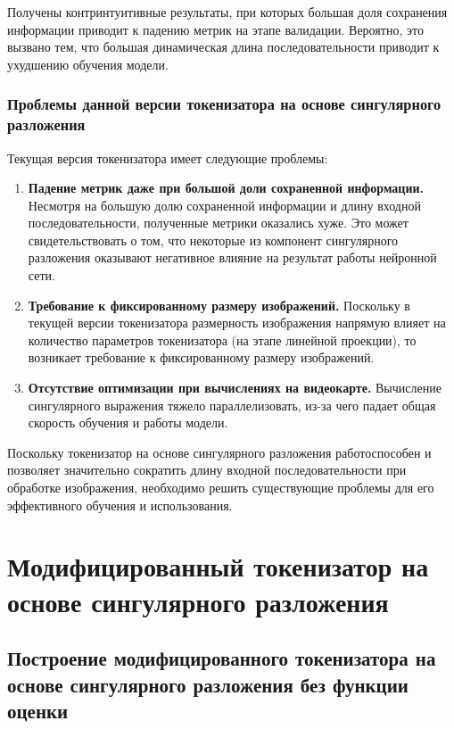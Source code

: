 \documentclass[times,specification,annotation]{itmo-student-thesis}
\begin{document}
Получены контринтуитивные результаты, при которых большая доля сохранения информации приводит к падению метрик на этапе валидации. Вероятно, это вызвано тем, что большая динамическая длина последовательности приводит к ухудшению обучения модели.

\subsubsection{Проблемы данной версии токенизатора на основе сингулярного разложения}

Текущая версия токенизатора имеет следующие проблемы:

\begin{enumerate}
    \item \textbf{Падение метрик даже при большой доли сохраненной информации.}
        Несмотря на большую долю сохраненной информации и длину входной последовательности, полученные метрики оказались хуже. Это может свидетельствовать о том, что некоторые из компонент сингулярного разложения оказывают негативное влияние на результат работы нейронной сети.
    \item \textbf{Требование к фиксированному размеру изображений.}
        Поскольку в текущей версии токенизатора размерность изображения напрямую влияет на количество параметров токенизатора (на этапе линейной проекции), то возникает требование к фиксированному размеру изображений.
        
    \item \textbf{Отсутствие оптимизации при вычислениях на видеокарте.}
        Вычисление сингулярного выражения тяжело параллелизовать, из-за чего падает общая скорость обучения и работы модели. 
\end{enumerate}

Поскольку токенизатор на основе сингулярного разложения работоспособен и позволяет значительно сократить длину входной последовательности при обработке изображения, необходимо решить существующие проблемы для его эффективного обучения и использования.

\section{Модифицированный токенизатор на основе сингулярного разложения}

\subsection{Построение модифицированного токенизатора на основе сингулярного разложения без функции оценки}
\end{document}
